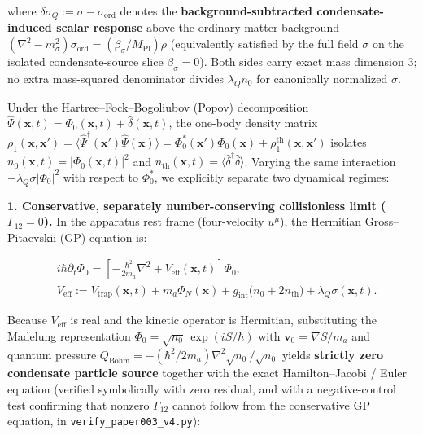 \documentclass[
  american,
  11pt,
  letterpaper,
]{article}
\begin{document}
where \(\delta\sigma_Q := \sigma - \sigma_{\mathrm{ord}}\) denotes the \textbf{background-subtracted condensate-induced scalar response} above the ordinary-matter background \((\nabla^2 - m_\sigma^2)\sigma_{\mathrm{ord}} = (\beta_\sigma / M_{\mathrm{Pl}})\rho\) (equivalently satisfied by the full field \(\sigma\) on the isolated condensate-source slice \(\beta_\sigma = 0\)). Both sides carry exact mass dimension \(3\); no extra mass-squared denominator divides \(\lambda_Q n_0\) for canonically normalized \(\sigma\).

Under the Hartree--Fock--Bogoliubov (Popov) decomposition \(\hat{\Psi}(\mathbf{x}, t) = \Phi_0(\mathbf{x}, t) + \hat{\delta}(\mathbf{x}, t)\), the one-body density matrix \(\rho_1(\mathbf{x}, \mathbf{x}') = \langle \hat{\Psi}^\dagger(\mathbf{x}')\hat{\Psi}(\mathbf{x})\rangle = \Phi_0^*(\mathbf{x}')\Phi_0(\mathbf{x}) + \rho_1^{\mathrm{th}}(\mathbf{x}, \mathbf{x}')\) isolates \(n_0(\mathbf{x}, t) = |\Phi_0(\mathbf{x}, t)|^2\) and \(n_{\mathrm{th}}(\mathbf{x}, t) = \langle \hat{\delta}^\dagger \hat{\delta} \rangle\). Varying the same interaction \(-\lambda_Q\sigma|\Phi_0|^2\) with respect to \(\Phi_0^*\), we explicitly separate two dynamical regimes:

\textbf{1. Conservative, separately number-conserving collisionless limit (\(\Gamma_{12} = 0\)).} In the apparatus rest frame (four-velocity \(u^\mu\)), the Hermitian Gross--Pitaevskii (GP) equation is:

\begin{equation}
\begin{aligned}
& i\hbar \partial_t \Phi_0
= \left[ -\frac{\hbar^2}{2 m_a}\nabla^2 + V_{\mathrm{eff}}(\mathbf{x}, t) \right]\Phi_0, \\
& V_{\mathrm{eff}} := V_{\mathrm{trap}}(\mathbf{x}, t) + m_a \Phi_N(\mathbf{x}) + g_{\mathrm{int}}\bigl(n_0 + 2 n_{\mathrm{th}}\bigr) + \lambda_Q \sigma(\mathbf{x}, t).
\end{aligned}
\end{equation}

Because \(V_{\mathrm{eff}}\) is real and the kinetic operator is Hermitian, substituting the Madelung representation \(\Phi_0 = \sqrt{n_0}\,\exp(i S / \hbar)\) with \(\mathbf{v}_0 = \nabla S / m_a\) and quantum pressure \(Q_{\mathrm{Bohm}} = -(\hbar^2/2m_a)\nabla^2\sqrt{n_0}/\sqrt{n_0}\) yields \textbf{strictly zero condensate particle source} together with the exact Hamilton--Jacobi / Euler equation (verified symbolically with zero residual, and with a negative-control test confirming that nonzero \(\Gamma_{12}\) cannot follow from the conservative GP equation, in \nolinkurl{verify_paper003_v4.py}):
\end{document}
